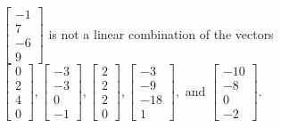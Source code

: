 \begin{exercise}
\begin{exerciseStatement}
  \end{exerciseStatement}
  \begin{exerciseAnswer}
   \(\left[\begin{array}{c}
-1 \\
7 \\
-6 \\
9
\end{array}\right]\) 
  	 is not  
	a linear combination of the vectors \(\left[\begin{array}{c}
0 \\
2 \\
4 \\
0
\end{array}\right] , \left[\begin{array}{c}
-3 \\
-3 \\
0 \\
-1
\end{array}\right] , \left[\begin{array}{c}
2 \\
2 \\
2 \\
0
\end{array}\right] , \left[\begin{array}{c}
-3 \\
-9 \\
-18 \\
1
\end{array}\right] , \text{ and } \left[\begin{array}{c}
-10 \\
-8 \\
0 \\
-2
\end{array}\right]\).

	
  


  \end{exerciseAnswer}
\end{exercise}